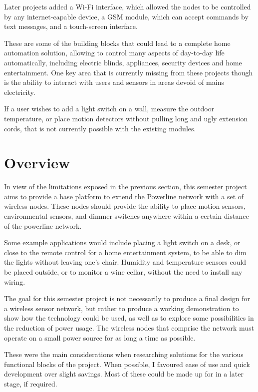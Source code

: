 Later projects added a Wi-Fi interface\cite{sallin2010}, which allowed the nodes
to be controlled by any internet-capable device, a GSM module\cite{sallin2010},
which can accept commands by text messages, and a touch-screen interface.

These are some of the building blocks that could lead to a complete home
automation solution, allowing to control many aspects of day-to-day life
automatically, including electric blinds, appliances, security devices and home
entertainment.  One key area that is currently missing from these projects
though is the ability to interact with users and sensors in areas devoid of
mains electricity.

If a user wishes to add a light switch on a wall, measure the outdoor
temperature, or place motion detectors without pulling long and ugly extension
cords, that is not currently possible with the existing modules.

\pagebreak
\section{Overview}
In view of the limitations exposed in the previous section, this semester
project aims to provide a base platform to extend the Powerline network with a
set of wireless nodes. These nodes should provide the ability to place motion
sensors, environmental sensors, and dimmer switches anywhere within a certain
distance of the powerline network. 

Some example applications would include placing a light switch on a desk, or
close to the remote control for a home entertainment system, to be able to dim
the lights without leaving one's chair. Humidity and temperature sensors could
be placed outside, or to monitor a wine cellar, without the need to install any
wiring.

The goal for this semester project is not necessarily to produce a final design
for a wireless sensor network, but rather to produce a working demonstration to
show how the technology could be used, as well as to explore some possibilities
in the reduction of power usage.  The wireless nodes that comprise the network
must operate on a small power source for as long a time as possible.

These were the main considerations when researching solutions for the various
functional blocks of the project. When possible, I favoured ease of use and
quick development over slight savings. Most of these could be made up for in a
later stage, if required.

